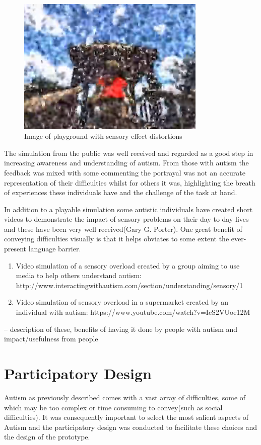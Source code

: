 \documentclass[11pt]{report}
\begin{document}
\begin{figure}[H]
\centering
\includegraphics[width=90mm]{images/litreview/autisim2.png}
\caption{Image of playground with sensory effect distortions}
\label{autisim2}
\end{figure}

The simulation from the public was well received and regarded as a good step in increasing awareness and understanding of autism. From those with autism the feedback was mixed with some commenting the portrayal was not an accurate representation of their difficulties whilst for others it was, highlighting the breath of experiences these individuals have and the challenge of the task at hand.

In addition to a playable simulation some autistic individuals have created short videos to demonstrate the impact of sensory problems on their day to day lives and these have been very well received(Gary G. Porter). One great benefit of conveying difficulties visually is that it helps obviates to some extent the ever-present language barrier. 

\begin{enumerate}
\item Video simulation of a sensory overload created by a group aiming to use media to help others understand autism: http://www.interactingwithautism.com/section/understanding/sensory/1
\item Video simulation of sensory overload in a supermarket created by an individual with autism: https://www.youtube.com/watch?v=IcS2VUoe12M
\end{enumerate}

-- description of these, benefits of having it done by people with autism and impact/usefulness from people


\chapter{Participatory Design}
Autism as previously described comes with a vast array of difficulties, some of which may be too complex or time consuming to convey(such as social difficulties). It was consequently important to select the most salient aspects of Autism and the participatory design was conducted to facilitate these choices and the design of the prototype. 
\end{document}
